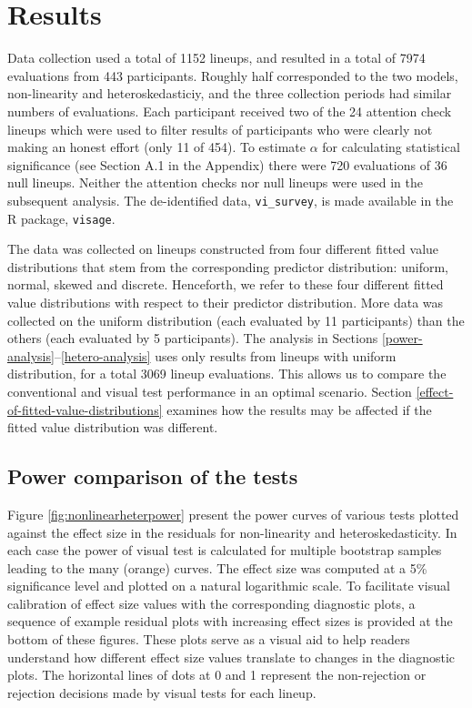 \documentclass[]{interact}
\theoremstyle{plain}%
\theoremstyle{definition}
\theoremstyle{remark}
\begin{document}
\hypertarget{results}{%
\section{Results}\label{results}}

Data collection used a total of 1152 lineups, and resulted in a total of
7974 evaluations from 443 participants. Roughly half corresponded to the
two models, non-linearity and heteroskedasticiy, and the three
collection periods had similar numbers of evaluations. Each participant
received two of the 24 attention check lineups which were used to filter
results of participants who were clearly not making an honest effort
(only 11 of 454). To estimate \(\alpha\) for calculating statistical
significance (see Section A.1 in the Appendix) there were 720
evaluations of 36 null lineups. Neither the attention checks nor null
lineups were used in the subsequent analysis. The de-identified data,
\texttt{vi\_survey}, is made available in the R package,
\texttt{visage}.

The data was collected on lineups constructed from four different fitted
value distributions that stem from the corresponding predictor
distribution: uniform, normal, skewed and discrete. Henceforth, we refer
to these four different fitted value distributions with respect to their
predictor distribution. More data was collected on the uniform
distribution (each evaluated by 11 participants) than the others (each
evaluated by 5 participants). The analysis in Sections
\ref{power-analysis}--\ref{hetero-analysis} uses only results from
lineups with uniform distribution, for a total 3069 lineup evaluations.
This allows us to compare the conventional and visual test performance
in an optimal scenario. Section
\ref{effect-of-fitted-value-distributions} examines how the results may
be affected if the fitted value distribution was different.

\hypertarget{power-comparison-of-the-tests}{%
\subsection{\texorpdfstring{Power comparison of the
tests\label{power-analysis}}{Power comparison of the tests}}\label{power-comparison-of-the-tests}}

Figure \ref{fig:nonlinearheterpower} present the power curves of various
tests plotted against the effect size in the residuals for non-linearity
and heteroskedasticity. In each case the power of visual test is
calculated for multiple bootstrap samples leading to the many (orange)
curves. The effect size was computed at a 5\% significance level and
plotted on a natural logarithmic scale. To facilitate visual calibration
of effect size values with the corresponding diagnostic plots, a
sequence of example residual plots with increasing effect sizes is
provided at the bottom of these figures. These plots serve as a visual
aid to help readers understand how different effect size values
translate to changes in the diagnostic plots. The horizontal lines of
dots at 0 and 1 represent the non-rejection or rejection decisions made
by visual tests for each lineup.
\end{document}
